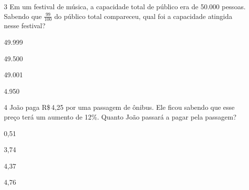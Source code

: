 


\num{3} Em um festival de música, a capacidade total de público era de 50.000
pessoas. Sabendo que $\frac{99}{100}$ do público total compareceu,
qual foi a capacidade atingida nesse festival?

\begin{escolha}
\item 49.999
\item 49.500
\item 49.001
\item 4.950
\end{escolha}







\num{4} João paga R\$\,4,25 por uma passagem de ônibus. Ele ficou sabendo que
esse preço terá um aumento de 12\%. Quanto João passará a pagar pela
passagem?

\begin{multicols}{2}
\begin{escolha}
\item 0,51
\item 3,74
\item 4,37
\item 4,76
\end{escolha}
\end{multicols}


